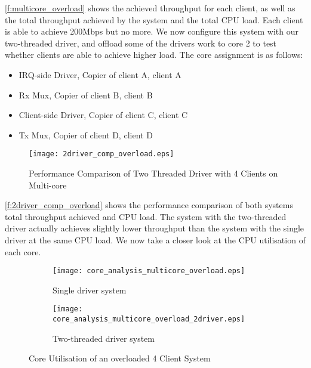 \autoref{f:multicore_overload} shows the achieved throughput for each client, as well as the total throughput achieved 
by the system and the total CPU load. Each client is able to achieve 200Mbps but no more. We now configure this system 
with our two-threaded driver, and offload some of the drivers work to core 2 to test whether clients are able to 
achieve higher load. The core assignment is as follows:

\begin{itemize}
    \item[\textbf{Core 0:}] IRQ-side Driver, Copier of client A, client A
    \item[\textbf{Core 1:}] Rx Mux, Copier of client B, client B
    \item[\textbf{Core 2:}] Client-side Driver, Copier of client C, client C
    \item[\textbf{Core 3:}] Tx Mux, Copier of client D, client D
\end{itemize}

\begin{figure}[h]
    \centering
    \texttt{[image: 2driver\_comp\_overload.eps]}
    \caption{Performance Comparison of Two Threaded Driver with 4 Clients on Multi-core}
    \label{f:2driver_comp_overload}
\end{figure}

\autoref{f:2driver_comp_overload} shows the performance comparison of both systems total throughput achieved and CPU load. 
The system with the two-threaded driver actually achieves slightly lower throughput than the system with the single driver
at the same CPU load. We now take a closer look at the CPU utilisation of each core.

\noindent\begin{figure}[H]
    \centering
	\begin{multicols}{2}
	\begin{subfigure}[b]{0.45\textwidth}
        \centering
        \texttt{[image: core\_analysis\_multicore\_overload.eps]}
        \caption{Single driver system}
        \label{f:core_analysis_mutlicore_overload}
    \end{subfigure}\qquad
    \begin{subfigure}[b]{0.45\textwidth}
        \centering
        \texttt{[image: core\_analysis\_multicore\_overload\_2driver.eps]}
        \caption{Two-threaded driver system}
        \label{f:core_analysis_mutlicore_overload_2driver}
    \end{subfigure}
\end{multicols}
\caption{Core Utilisation of an overloaded 4 Client System }
\label{f:core_util_multi}
\end{figure}

